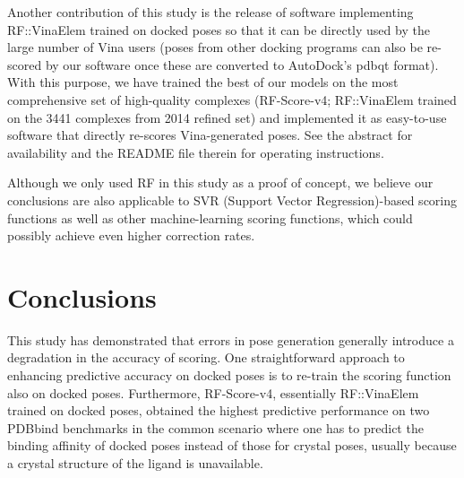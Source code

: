 \documentclass[twocolumn]{bmcart}
\begin{document}
Another contribution of this study is the release of software implementing RF::VinaElem trained on docked poses so that it can be directly used by the large number of Vina users (poses from other docking programs can also be re-scored by our software once these are converted to AutoDock’s pdbqt format). With this purpose, we have trained the best of our models on the most comprehensive set of high-quality complexes (RF-Score-v4; RF::VinaElem trained on the 3441 complexes from 2014 refined set) and implemented it as easy-to-use software that directly re-scores Vina-generated poses. See the abstract for availability and the README file therein for operating instructions.

Although we only used RF in this study as a proof of concept, we believe our conclusions are also applicable to SVR (Support Vector Regression)-based scoring functions \cite{1295,963} as well as other machine-learning scoring functions, which could possibly achieve even higher correction rates.

\section*{Conclusions}

This study has demonstrated that errors in pose generation generally introduce a degradation in the accuracy of scoring. One straightforward approach to enhancing predictive accuracy on docked poses is to re-train the scoring function also on docked poses. Furthermore, RF-Score-v4, essentially RF::VinaElem trained on docked poses, obtained the highest predictive performance on two PDBbind benchmarks in the common scenario where one has to predict the binding affinity of docked poses instead of those for crystal poses, usually because a crystal structure of the ligand is unavailable. %

\end{document}
